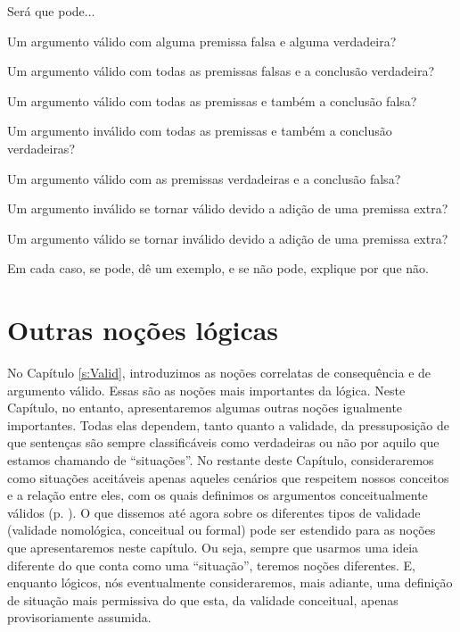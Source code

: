 \problempart
\label{pr.EnglishCombinations}
Será que pode...
	\begin{earg}
		\item Um argumento válido com alguma premissa falsa e alguma verdadeira?
		\item Um argumento válido com todas as premissas falsas e a conclusão verdadeira?
		\item Um argumento válido com todas as premissas e também a conclusão falsa?
		\item Um argumento inválido com todas as premissas e também a conclusão verdadeiras?
		\item Um argumento válido com as premissas verdadeiras e a conclusão falsa?
		\item Um argumento inválido se tornar válido devido a adição de uma premissa extra?
		\item Um argumento válido se tornar inválido devido a adição de uma premissa extra?
	\end{earg}
Em cada caso, se pode, dê um exemplo, e se não pode, explique por que não.




\chapter{Outras noções lógicas}\label{s:BasicNotions}

No Capítulo \ref{s:Valid}, introduzimos as noções correlatas de consequência e de argumento válido.
Essas são as noções mais importantes da lógica.
Neste Capítulo, no entanto, apresentaremos algumas outras noções igualmente importantes.
Todas elas dependem, tanto quanto a validade, da pressuposição de que sentenças são sempre classificáveis como  verdadeiras ou não por aquilo que estamos chamando de ``situações''.
No restante deste Capítulo, consideraremos como situações aceitáveis apenas aqueles cenários que respeitem nossos conceitos e a relação entre eles, com os quais definimos os argumentos conceitualmente válidos (p. \pageref{nomoval}).
O que dissemos até agora sobre os diferentes tipos de validade (validade nomológica, conceitual ou formal) pode ser estendido para as noções que apresentaremos neste capítulo. Ou seja, sempre que usarmos uma ideia diferente do que conta como uma ``situação'', teremos noções diferentes.
E, enquanto lógicos, nós eventualmente consideraremos, mais adiante, uma definição de situação mais permissiva do que esta, da validade conceitual, apenas provisoriamente assumida.

